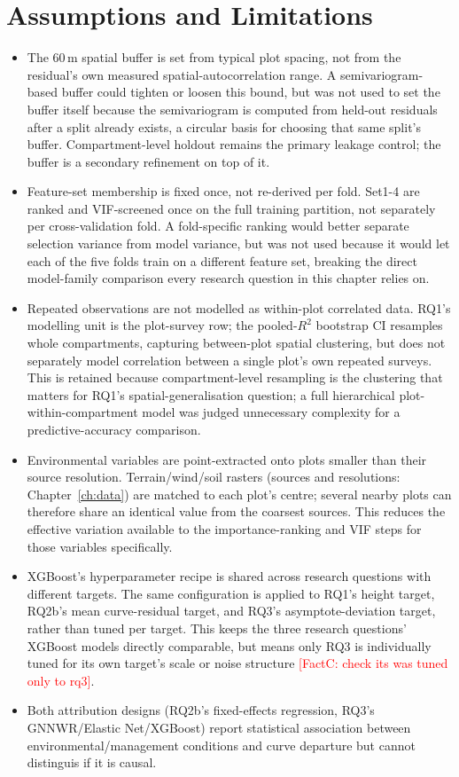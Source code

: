 \documentclass[logo,msc,ai]{infthesis}           %
\newcommand{\fc}[1]{\textcolor{red}{[FactC: #1]}}
\begin{document}
\section{Assumptions and Limitations}
\label{sec:limitations}

\begin{itemize}
\setlength\itemsep{2pt}
\item The 60\,m  spatial buffer is set from typical plot spacing, not from the residual's own measured spatial-autocorrelation range. A semivariogram-based buffer could tighten or loosen this bound, but was not used to set the buffer itself because the semivariogram is computed from held-out residuals after a split already exists, a circular basis for choosing that same split's buffer. Compartment-level holdout remains the primary leakage control; the buffer is a secondary refinement on top of it.
\item Feature-set membership is fixed once, not re-derived per fold. Set1-4 are ranked and VIF-screened once on the full training partition, not separately per cross-validation fold. A fold-specific ranking would better separate selection variance from model variance, but was not used because it would let each of the five folds train on a different feature set, breaking the direct model-family comparison every research question in this chapter relies on.
\item Repeated observations are not modelled as within-plot correlated data. RQ1's modelling unit is the plot-survey row; the pooled-$R^2$ bootstrap CI resamples whole compartments, capturing between-plot spatial clustering, but does not separately model correlation between a single plot's own repeated surveys. This is retained because compartment-level resampling is the clustering that matters for RQ1's spatial-generalisation question; a full hierarchical plot-within-compartment model was judged unnecessary complexity for a predictive-accuracy comparison.
\item Environmental variables are point-extracted onto plots smaller than their source resolution. Terrain/wind/soil rasters (sources and resolutions: Chapter~\ref{ch:data}) are matched to each plot's centre; several nearby plots can therefore share an identical value from the coarsest sources. This reduces the effective variation available to the importance-ranking and VIF steps for those variables specifically.
\item XGBoost's hyperparameter recipe is shared across research questions with different targets. The same configuration is applied to RQ1's height target, RQ2b's mean curve-residual target, and RQ3's asymptote-deviation target, rather than tuned per target. This keeps the three research questions' XGBoost models directly comparable, but means only RQ3 is individually tuned for its own target's scale or noise structure \fc{check its was tuned only to rq3}.
\item Both attribution designs (RQ2b's fixed-effects regression, RQ3's GNNWR/Elastic Net/XGBoost) report statistical association between environmental/management conditions and curve departure but cannot distinguis if it is causal. 
\end{itemize}
\end{document}
